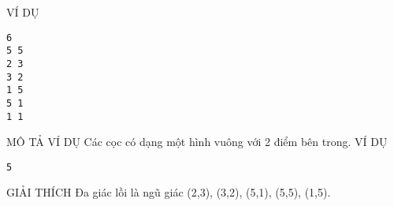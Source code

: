 VÍ DỤ  
\begin{verbatim}
6
5 5
2 3
3 2
1 5
5 1
1 1
\end{verbatim}
   MÔ TẢ VÍ DỤ  
Các cọc có dạng một hình vuông với 2 điểm bên trong.
   VÍ DỤ  
\begin{verbatim}
5
\end{verbatim}
   GIẢI THÍCH  
Đa giác lồi là ngũ giác (2,3), (3,2), (5,1), (5,5), (1,5).